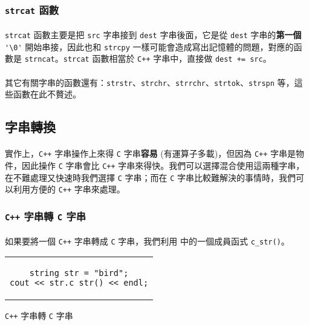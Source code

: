 \documentclass[12pt,a4paper,oneside]{report}
\begin{document}
\begin{CJK}{UTF8}{bkai}
\subsubsection{\lstinline!strcat! 函數}

\paragraph{}\lstinline!strcat! 函數主要是把 \lstinline!src! 字串接到 \lstinline!dest! 字串後面，它是從 \lstinline!dest! 字串的\textbf{第一個} \lstinline!'\0'! 開始串接，因此也和 \lstinline!strcpy! 一樣可能會造成寫出記憶體的問題，對應的函數是 \lstinline!strncat!。\lstinline!strcat! 函數相當於 \texttt{C++} 字串中，直接做 \lstinline!dest += src!。

\paragraph{}其它有關字串的函數還有：\lstinline!strstr!、\lstinline!strchr!、\lstinline!strrchr!、\lstinline!strtok!、\lstinline!strspn! 等，這些函數在此不贅述。

\subsection{字串轉換}

\paragraph{}實作上，\texttt{C++} 字串操作上來得 \texttt{C} 字串\textbf{容易} (有運算子多載)，但因為 \texttt{C++} 字串是物件，因此操作 \texttt{C} 字串會比 \texttt{C++} 字串來得快。我們可以選擇混合使用這兩種字串，在不難處理又快速時我們選擇 \texttt{C} 字串；而在 \texttt{C} 字串比較難解決的事情時，我們可以利用方便的 \texttt{C++} 字串來處理。

\subsubsection{\texttt{C++} 字串轉 \texttt{C} 字串}

\paragraph{}如果要將一個 \texttt{C++} 字串轉成 \texttt{C} 字串，我們利用  中的一個成員函式 \lstinline!c_str()!。

\begin{code}[h!]
  \centering
  \begin{tabular}{c}
  \begin{lstlisting}
string str = "bird";
cout << str.c_str() << endl;
  \end{lstlisting}
  \end{tabular}
  \caption{\texttt{C++} 字串轉 \texttt{C} 字串}
  \label{string:mani:code:string:cpp:to:c}
\end{code}


\end{CJK}
\end{document}

